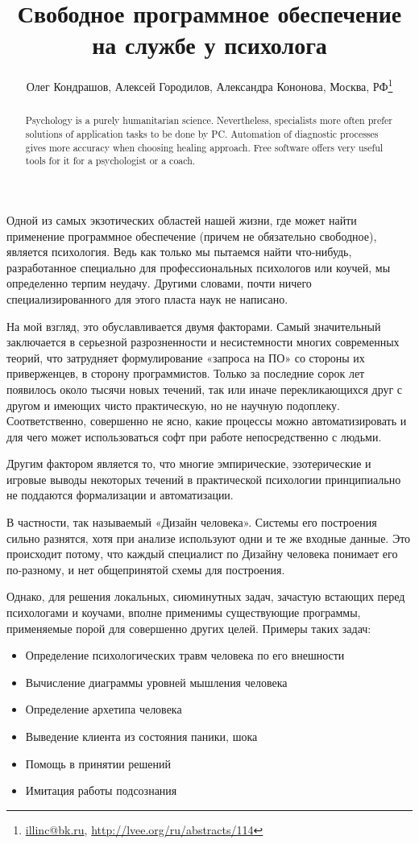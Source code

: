 \documentclass[10pt, a5paper]{article}
\begin{document}
\title{Свободное программное обеспечение на службе у психолога}
\author{Олег Кондрашов, Алексей Городилов, Александра Кононова, Москва, РФ\footnote{\url{illinc@bk.ru}, \url{http://lvee.org/ru/abstracts/114}}}
\maketitle
\begin{abstract}
Psychology is a purely humanitarian science. Nevertheless, specialists more often prefer solutions of application tasks to be done by PC. Automation of diagnostic processes gives more accuracy when choosing healing approach. Free software offers very useful tools for it for a psychologist or a coach.
\end{abstract}
Одной из самых экзотических областей нашей жизни, где может найти применение программное обеспечение (причем не обязательно свободное), является психология. Ведь как только мы пытаемся найти что-нибудь, разработанное специально для профессиональных психологов или коучей, мы определенно терпим неудачу. Другими словами, почти ничего специализированного для этого пласта наук не написано.

На мой взгляд, это обуславливается двумя факторами. Самый значительный заключается в серьезной разрозненности и несистемности многих современных теорий, что затрудняет формулирование «запроса на ПО» со стороны их приверженцев, в сторону программистов. Только за последние сорок лет появилось около тысячи новых течений, так или иначе перекликающихся друг с другом и имеющих чисто практическую, но не научную подоплеку. Соответственно, совершенно не ясно, какие процессы можно автоматизировать и для чего может использоваться софт при работе непосредственно с людьми.

Другим фактором является то, что многие эмпирические, эзотерические и игровые выводы некоторых течений в практической психологии принципиально не поддаются формализации и автоматизации.

В частности, так называемый «Дизайн человека». Системы его построения сильно разнятся, хотя при анализе используют одни и те же входные данные. Это происходит потому, что каждый специалист по Дизайну человека понимает его по-разному, и нет общепринятой схемы для построения.

Однако, для решения локальных, сиюминутных задач, зачастую встающих перед психологами и коучами, вполне применимы существующие программы, применяемые порой для совершенно других целей. Примеры таких задач:
\begin{itemize}
 \item	Определение психологических травм человека по его внешности
 \item	Вычисление диаграммы уровней мышления человека
 \item	Определение архетипа человека
 \item	Выведение клиента из состояния паники, шока
 \item	Помощь в принятии решений
 \item	Имитация работы подсознания
\end{itemize}
\end{document}
